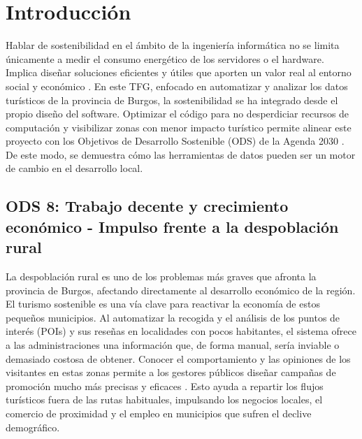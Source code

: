 
\section{Introducción}
Hablar de sostenibilidad en el ámbito de la ingeniería informática no se limita únicamente a medir el consumo energético de los servidores o el hardware. Implica diseñar soluciones eficientes y útiles que aporten un valor real al entorno social y económico \cite{crue_sostenibilidad_2012}. En este TFG, enfocado en automatizar y analizar los datos turísticos de la provincia de Burgos, la sostenibilidad se ha integrado desde el propio diseño del software. Optimizar el código para no desperdiciar recursos de computación y visibilizar zonas con menor impacto turístico permite alinear este proyecto con los Objetivos de Desarrollo Sostenible (ODS) de la Agenda 2030 \cite{onu_agenda2030}. De este modo, se demuestra cómo las herramientas de datos pueden ser un motor de cambio en el desarrollo local.

\subsection{ODS 8: Trabajo decente y crecimiento económico - Impulso frente a la despoblación rural}
La despoblación rural es uno de los problemas más graves que afronta la provincia de Burgos, afectando directamente al desarrollo económico de la región. El turismo sostenible es una vía clave para reactivar la economía de estos pequeños municipios. Al automatizar la recogida y el análisis de los puntos de interés (POIs) y sus reseñas en localidades con pocos habitantes, el sistema ofrece a las administraciones una información que, de forma manual, sería inviable o demasiado costosa de obtener. Conocer el comportamiento y las opiniones de los visitantes en estas zonas permite a los gestores públicos diseñar campañas de promoción mucho más precisas y eficaces \cite{onu_ods8}. Esto ayuda a repartir los flujos turísticos fuera de las rutas habituales, impulsando los negocios locales, el comercio de proximidad y el empleo en municipios que sufren el declive demográfico.

